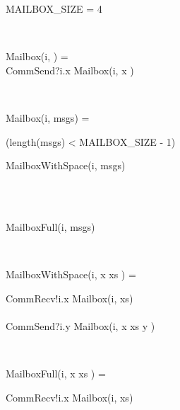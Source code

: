 \begin{process}

\begin{block}
MAILBOX\_SIZE = 4
\end{block} \\

\begin{block}
Mailbox(i, \nil) = {} \\ \quad
CommSend?i.x \then Mailbox(i, \lseq x \rseq) 
\end{block} \\

\begin{block}
Mailbox(i, msgs) = {} \\ \quad
  \begin{block} 
  \If (length(msgs) < MAILBOX\_SIZE - 1) \Then {} \\ \quad
    \begin{block} 
      MailboxWithSpace(i, msgs)
    \end{block} \\
  \Else {} \\ \quad
    \begin{block}
      MailboxFull(i, msgs)
    \end{block}
  \end{block} 
\end{block} \\

\begin{block}
MailboxWithSpace(i, \lseq x \rseq \cat xs ) = {} \\ \quad 
  \begin{block}
    CommRecv!i.x \then Mailbox(i, xs) \\
    \Extchoice \\
    CommSend?i.y \then Mailbox(i, \lseq x \rseq \cat xs \cat \lseq y \rseq ) 
  \end{block}
\end{block} \\

\begin{block}
MailboxFull(i, \lseq x \rseq \cat xs ) = {} \\ \quad 
  \begin{block}
    CommRecv!i.x \then Mailbox(i, xs) \\
  \end{block}
\end{block} \\
\end{process}

